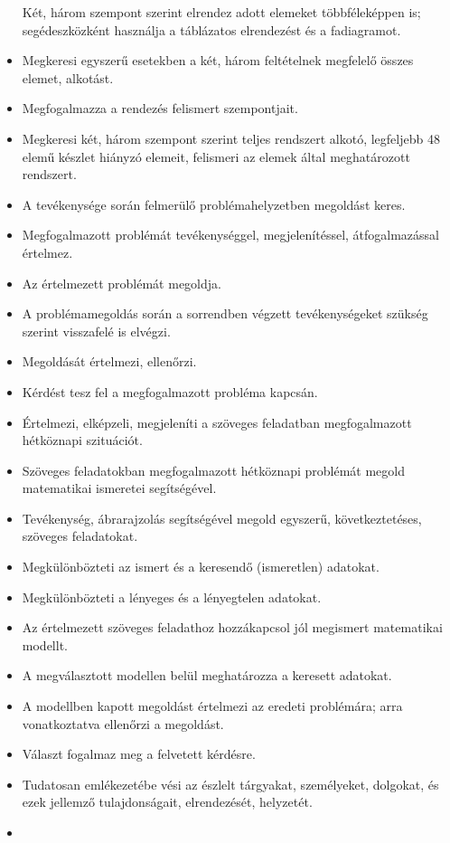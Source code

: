 \begin{itemize}
  Két, három szempont szerint elrendez adott elemeket többféleképpen is;
  segédeszközként használja a táblázatos elrendezést és a fadiagramot.
\item
  Megkeresi egyszerű esetekben a két, három feltételnek megfelelő összes
  elemet, alkotást.
\item
  Megfogalmazza a rendezés felismert szempontjait.
\item
  Megkeresi két, három szempont szerint teljes rendszert alkotó,
  legfeljebb 48 elemű készlet hiányzó elemeit, felismeri az elemek által
  meghatározott rendszert.
\item
  A tevékenysége során felmerülő problémahelyzetben megoldást keres.
\item
  Megfogalmazott problémát tevékenységgel, megjelenítéssel,
  átfogalmazással értelmez.
\item
  Az értelmezett problémát megoldja.
\item
  A problémamegoldás során a sorrendben végzett tevékenységeket szükség
  szerint visszafelé is elvégzi.
\item
  Megoldását értelmezi, ellenőrzi.
\item
  Kérdést tesz fel a megfogalmazott probléma kapcsán.
\item
  Értelmezi, elképzeli, megjeleníti a szöveges feladatban megfogalmazott
  hétköznapi szituációt.
\item
  Szöveges feladatokban megfogalmazott hétköznapi problémát megold
  matematikai ismeretei segítségével.
\item
  Tevékenység, ábrarajzolás segítségével megold egyszerű,
  következtetéses, szöveges feladatokat.
\item
  Megkülönbözteti az ismert és a keresendő (ismeretlen) adatokat.
\item
  Megkülönbözteti a lényeges és a lényegtelen adatokat.
\item
  Az értelmezett szöveges feladathoz hozzákapcsol jól megismert
  matematikai modellt.
\item
  A megválasztott modellen belül meghatározza a keresett adatokat.
\item
  A modellben kapott megoldást értelmezi az eredeti problémára; arra
  vonatkoztatva ellenőrzi a megoldást.
\item
  Választ fogalmaz meg a felvetett kérdésre.
\item
  Tudatosan emlékezetébe vési az észlelt tárgyakat, személyeket,
  dolgokat, és ezek jellemző tulajdonságait, elrendezését, helyzetét.
\item

\end{itemize}
